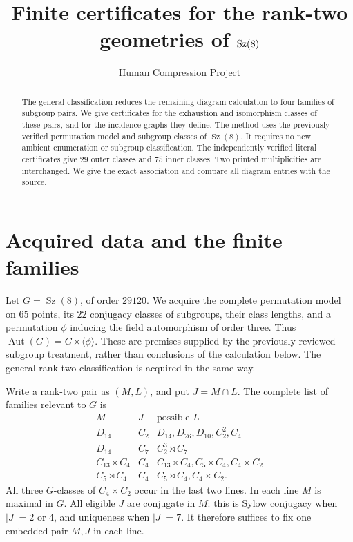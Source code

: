 \documentclass[11pt]{article}
\title{Finite certificates for the rank-two geometries of $\Sz(8)$}
\author{Human Compression Project}
\date{}
\newcommand{\Sz}{\operatorname{Sz}}
\newcommand{\Aut}{\operatorname{Aut}}
\begin{document}
\maketitle
\begin{abstract}
The general classification reduces the remaining diagram calculation to four
families of subgroup pairs. We give certificates for the exhaustion and
isomorphism classes of these pairs, and for the incidence graphs they define.
The method uses the previously verified permutation model and subgroup
classes of $\Sz(8)$. It requires no new ambient enumeration or subgroup
classification. The independently verified literal certificates give $29$ outer classes and
$75$ inner classes. Two printed multiplicities are interchanged. We give the
exact association and compare all diagram entries with the source.
\end{abstract}

\section{Acquired data and the finite families}
Let $G=\Sz(8)$, of order $29120$. We acquire the complete permutation model
on $65$ points, its $22$ conjugacy classes of subgroups, their class lengths,
and a permutation $\phi$ inducing the field automorphism of order three.
Thus $\Aut(G)=G\rtimes\langle\phi\rangle$. These are premises supplied by the
previously reviewed subgroup treatment, rather than conclusions of the
calculation below. The general rank-two classification is acquired in the
same way.

Write a rank-two pair as $(M,L)$, and put $J=M\cap L$. The complete list of
families relevant to $G$ is
\[
\begin{array}{ccl}
 M&J&\text{possible }L\\\hline
 D_{14}&C_2&D_{14},D_{26},D_{10},C_2^2,C_4\\
 D_{14}&C_7&C_2^3\rtimes C_7\\
 C_{13}\rtimes C_4&C_4&C_{13}\rtimes C_4,C_5\rtimes C_4,C_4\times C_2\\
 C_5\rtimes C_4&C_4&C_5\rtimes C_4,C_4\times C_2.
\end{array}
\]
All three $G$-classes of $C_4\times C_2$ occur in the last two lines.
In each line $M$ is maximal in $G$. All eligible $J$ are conjugate in $M$:
this is Sylow conjugacy when $|J|=2$ or $4$, and uniqueness when $|J|=7$.
It therefore suffices to fix one embedded pair $M,J$ in each line.
\end{document}
